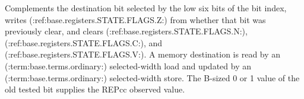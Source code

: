 Complements the destination bit selected by the low six bits of the bit index, writes (:ref:base.registers.STATE.FLAGS.Z:) from whether that bit was previously clear, and clears (:ref:base.registers.STATE.FLAGS.N:), (:ref:base.registers.STATE.FLAGS.C:), and (:ref:base.registers.STATE.FLAGS.V:). A memory destination is read by an (:term:base.terms.ordinary:) selected-width load and updated by an (:term:base.terms.ordinary:) selected-width store. The B-sized 0 or 1 value of the old tested bit supplies the REPcc observed value.
